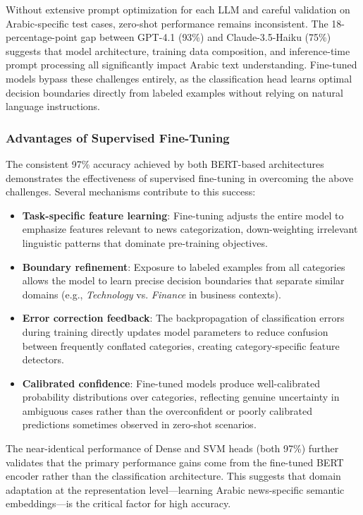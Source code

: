 \documentclass[sn-mathphys-num]{sn-jnl}
\begin{document}
Without extensive prompt optimization for each LLM and careful validation on Arabic-specific test cases, zero-shot performance remains inconsistent. The 18-percentage-point gap between GPT-4.1 (93\%) and Claude-3.5-Haiku (75\%) suggests that model architecture, training data composition, and inference-time prompt processing all significantly impact Arabic text understanding. Fine-tuned models bypass these challenges entirely, as the classification head learns optimal decision boundaries directly from labeled examples without relying on natural language instructions.

\subsubsection{Advantages of Supervised Fine-Tuning}

The consistent 97\% accuracy achieved by both BERT-based architectures demonstrates the effectiveness of supervised fine-tuning in overcoming the above challenges. Several mechanisms contribute to this success:

\begin{itemize}
    \item \textbf{Task-specific feature learning}: Fine-tuning adjusts the entire model to emphasize features relevant to news categorization, down-weighting irrelevant linguistic patterns that dominate pre-training objectives.
    
    \item \textbf{Boundary refinement}: Exposure to labeled examples from all categories allows the model to learn precise decision boundaries that separate similar domains (e.g., \textit{Technology} vs. \textit{Finance} in business contexts).
    
    \item \textbf{Error correction feedback}: The backpropagation of classification errors during training directly updates model parameters to reduce confusion between frequently conflated categories, creating category-specific feature detectors.
    
    \item \textbf{Calibrated confidence}: Fine-tuned models produce well-calibrated probability distributions over categories, reflecting genuine uncertainty in ambiguous cases rather than the overconfident or poorly calibrated predictions sometimes observed in zero-shot scenarios.
\end{itemize}

The near-identical performance of Dense and SVM heads (both 97\%) further validates that the primary performance gains come from the fine-tuned BERT encoder rather than the classification architecture. This suggests that domain adaptation at the representation level---learning Arabic news-specific semantic embeddings---is the critical factor for high accuracy.
\end{document}
